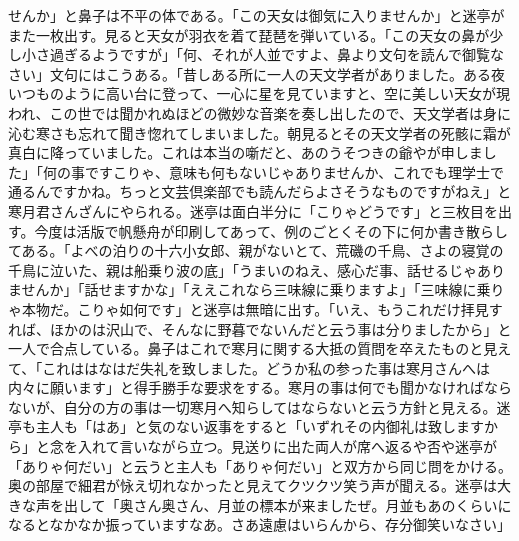 \documentclass[12pt, openright]{book}
\begin{document}
せんか」と鼻子は不平の体である。「この天女は御気に入りませんか」と迷亭がまた一枚出す。見ると天女が羽衣を着て琵琶を弾いている。「この天女の鼻が少し小さ過ぎるようですが」「何、それが人並ですよ、鼻より文句を読んで御覧なさい」文句にはこうある。「昔しある所に一人の天文学者がありました。ある夜いつものように高い台に登って、一心に星を見ていますと、空に美しい天女が現われ、この世では聞かれぬほどの微妙な音楽を奏し出したので、天文学者は身に沁む寒さも忘れて聞き惚れてしまいました。朝見るとその天文学者の死骸に霜が真白に降っていました。これは本当の噺だと、あのうそつきの爺やが申しました」「何の事ですこりゃ、意味も何もないじゃありませんか、これでも理学士で通るんですかね。ちっと文芸倶楽部でも読んだらよさそうなものですがねえ」と寒月君さんざんにやられる。迷亭は面白半分に「こりゃどうです」と三枚目を出す。今度は活版で帆懸舟が印刷してあって、例のごとくその下に何か書き散らしてある。「よべの泊りの十六小女郎、親がないとて、荒磯の千鳥、さよの寝覚の千鳥に泣いた、親は船乗り波の底」「うまいのねえ、感心だ事、話せるじゃありませんか」「話せますかな」「ええこれなら三味線に乗りますよ」「三味線に乗りゃ本物だ。こりゃ如何です」と迷亭は無暗に出す。「いえ、もうこれだけ拝見すれば、ほかのは沢山で、そんなに野暮でないんだと云う事は分りましたから」と一人で合点している。鼻子はこれで寒月に関する大抵の質問を卒えたものと見えて、「これははなはだ失礼を致しました。どうか私の参った事は寒月さんへは内々に願います」と得手勝手な要求をする。寒月の事は何でも聞かなければならないが、自分の方の事は一切寒月へ知らしてはならないと云う方針と見える。迷亭も主人も「はあ」と気のない返事をすると「いずれその内御礼は致しますから」と念を入れて言いながら立つ。見送りに出た両人が席へ返るや否や迷亭が「ありゃ何だい」と云うと主人も「ありゃ何だい」と双方から同じ問をかける。奥の部屋で細君が怺え切れなかったと見えてクツクツ笑う声が聞える。迷亭は大きな声を出して「奥さん奥さん、月並の標本が来ましたぜ。月並もあのくらいになるとなかなか振っていますなあ。さあ遠慮はいらんから、存分御笑いなさい」
\end{document}
